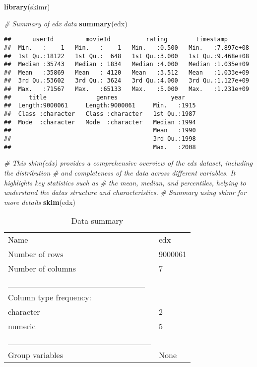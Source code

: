 \documentclass[
]{article}
\newenvironment{Shaded}{\begin{snugshade}}{\end{snugshade}}
\newcommand{\CommentTok}[1]{\textcolor[rgb]{0.56,0.35,0.01}{\textit{#1}}}
\newcommand{\FunctionTok}[1]{\textcolor[rgb]{0.13,0.29,0.53}{\textbf{#1}}}
\newcommand{\NormalTok}[1]{#1}
\begin{document}
\begin{Shaded}
\begin{Highlighting}[]
\FunctionTok{library}\NormalTok{(skimr)}

\CommentTok{\# Summary of edx data}
\FunctionTok{summary}\NormalTok{(edx)}
\end{Highlighting}
\end{Shaded}

\begin{verbatim}
##      userId         movieId          rating        timestamp        
##  Min.   :    1   Min.   :    1   Min.   :0.500   Min.   :7.897e+08  
##  1st Qu.:18122   1st Qu.:  648   1st Qu.:3.000   1st Qu.:9.468e+08  
##  Median :35743   Median : 1834   Median :4.000   Median :1.035e+09  
##  Mean   :35869   Mean   : 4120   Mean   :3.512   Mean   :1.033e+09  
##  3rd Qu.:53602   3rd Qu.: 3624   3rd Qu.:4.000   3rd Qu.:1.127e+09  
##  Max.   :71567   Max.   :65133   Max.   :5.000   Max.   :1.231e+09  
##     title              genres               year     
##  Length:9000061     Length:9000061     Min.   :1915  
##  Class :character   Class :character   1st Qu.:1987  
##  Mode  :character   Mode  :character   Median :1994  
##                                        Mean   :1990  
##                                        3rd Qu.:1998  
##                                        Max.   :2008
\end{verbatim}

\begin{Shaded}
\begin{Highlighting}[]
\CommentTok{\# This skim(edx) provides a comprehensive overview of the edx dataset, including the distribution }
\CommentTok{\# and completeness of the data across different variables. It highlights key statistics such as }
\CommentTok{\# the mean, median, and percentiles, helping to understand the data\textquotesingle{}s structure and characteristics.}
\CommentTok{\# Summary using skimr for more details}
\FunctionTok{skim}\NormalTok{(edx)}
\end{Highlighting}
\end{Shaded}

\begin{longtable}[]{@{}ll@{}}
\caption{Data summary}\tabularnewline
\toprule\noalign{}
\endfirsthead
\endhead
\bottomrule\noalign{}
\endlastfoot
Name & edx \\
Number of rows & 9000061 \\
Number of columns & 7 \\
\_\_\_\_\_\_\_\_\_\_\_\_\_\_\_\_\_\_\_\_\_\_\_ & \\
Column type frequency: & \\
character & 2 \\
numeric & 5 \\
\_\_\_\_\_\_\_\_\_\_\_\_\_\_\_\_\_\_\_\_\_\_\_\_ & \\
Group variables & None \\
\end{longtable}
\end{document}
